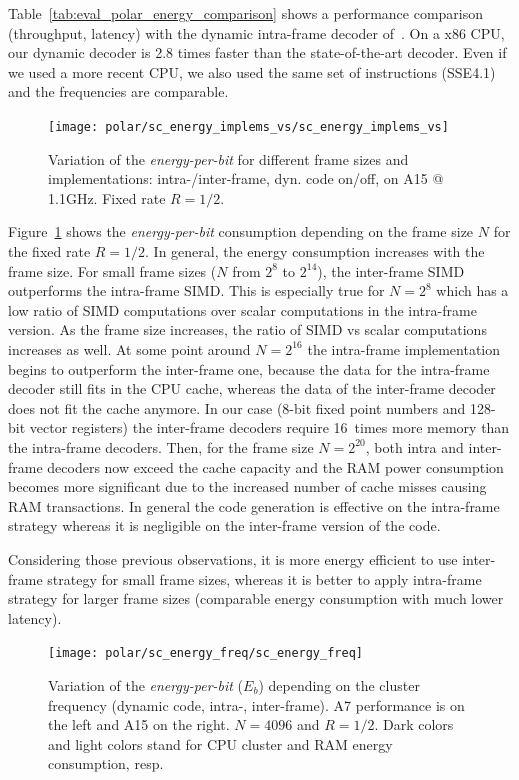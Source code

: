 Table~\ref{tab:eval_polar_energy_comparison} shows a performance comparison
(throughput, latency) with the dynamic intra-frame decoder of~\cite{Giard2014}.
On a x86 CPU, our dynamic decoder is 2.8 times faster than the state-of-the-art
decoder. Even if we used a more recent CPU, we also used the same set of
instructions (SSE4.1) and the frequencies are comparable.

\begin{figure}
  \centering
  \texttt{[image: polar/sc\_energy\_implems\_vs/sc\_energy\_implems\_vs]}
  \caption{Variation of the \emph{energy-per-bit} for different frame sizes and
    implementations: intra-/inter-frame, dyn. code on/off, on A15 @ 1.1GHz.
    Fixed rate $R = 1/2$.}
  \label{plot:eval_polar_sc_energy_implems_vs}
\end{figure}

Figure~\ref{plot:eval_polar_sc_energy_implems_vs} shows the
\emph{energy-per-bit} consumption depending on the frame size $N$ for the fixed
rate $R = 1/2$. In general, the energy consumption increases with the frame
size. For small frame sizes ($N$ from $2^{8}$ to $2^{14}$), the inter-frame SIMD
outperforms the intra-frame SIMD. This is especially true for $N = 2^8$ which
has a low ratio of SIMD computations over scalar computations in the intra-frame
version. As the frame size increases, the ratio of SIMD vs scalar computations
increases as well. At some point around $N = 2^{16}$ the intra-frame
implementation begins to outperform the inter-frame one, because the data for
the intra-frame decoder still fits in the CPU cache, whereas the data of the
inter-frame decoder does not fit the cache anymore. In our case (8-bit fixed
point numbers and 128-bit vector registers) the inter-frame decoders require
16~times more memory than the intra-frame decoders. Then, for the frame size
$N = 2^{20}$, both intra and inter-frame decoders now exceed the cache capacity
and the RAM power consumption becomes more significant due to the increased
number of cache misses causing RAM transactions. In general the code generation
is effective on the intra-frame strategy whereas it is negligible on the
inter-frame version of the code.

Considering those previous observations, it is more energy efficient to use
inter-frame strategy for small frame sizes, whereas it is better to apply
intra-frame strategy for larger frame sizes (comparable energy consumption with
much lower latency).

\begin{figure}
  \centering
  \texttt{[image: polar/sc\_energy\_freq/sc\_energy\_freq]}
  \caption{Variation of the \emph{energy-per-bit} ($E_b$) depending on the
    cluster frequency (dynamic code, intra-, inter-frame).
    A7 performance is on the left and A15 on the right. $N = 4096$ and $R = 1/2$.
    Dark colors and light colors stand for CPU cluster and RAM energy consumption,
    resp.}
  \label{plot:eval_polar_sc_energy_freq}
\end{figure}

